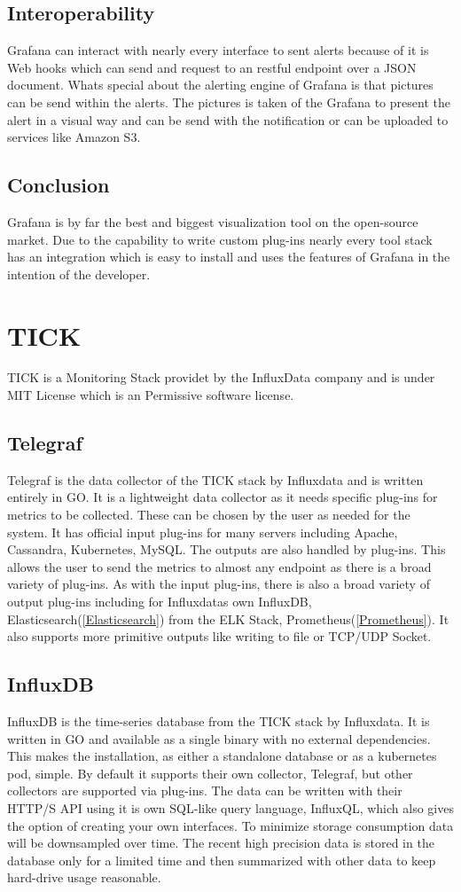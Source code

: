 \subsection{Interoperability}
Grafana can interact with nearly every interface to sent alerts because of it is Web hooks which can send and request to an restful endpoint over a JSON document. Whats special about the alerting engine of Grafana is that pictures can be send within the alerts. The pictures is taken of the Grafana to present the alert in a visual way and can be send with the notification or can be uploaded to services like Amazon S3.

\subsection{Conclusion}
Grafana is by far the best and biggest visualization tool on the open-source market. Due to the capability to write custom plug-ins nearly every tool stack has an integration which is easy to install and uses the features of Grafana in the intention of the developer.

\section{TICK}
\label{tick}
TICK is a Monitoring Stack providet by the InfluxData company and is under MIT License which is an Permissive software license.
\subsection{Telegraf}
Telegraf is the data collector of the TICK stack by Influxdata and is written entirely in GO. It is a lightweight data collector as it needs specific plug-ins for metrics to be collected. These can be chosen by the user as needed for the system. It has official input plug-ins for many servers including Apache, Cassandra, Kubernetes, MySQL.
The outputs are also handled by plug-ins. This allows the user to send the metrics to almost any endpoint as there is a broad variety of plug-ins. As with the input plug-ins, there is also a broad variety of output plug-ins including for Influxdatas own InfluxDB, Elasticsearch(\ref{Elasticsearch}) from the ELK Stack, Prometheus(\ref{Prometheus}). It also supports more primitive outputs like writing to file or TCP/UDP Socket.
\subsection{InfluxDB}
InfluxDB is the time-series database from the TICK stack by Influxdata. It is written in GO and available as a single binary with no external dependencies. This makes the installation, as either a standalone database or as a kubernetes pod, simple.
By default it supports their own collector, Telegraf, but other collectors are supported via plug-ins. The data can be written with their  HTTP/S API using it is own SQL-like query language, InfluxQL, which also gives the option of creating your own interfaces.
To minimize storage consumption data will be downsampled over time. The recent high precision data is stored in the database only for a limited time and then summarized with other data to keep hard-drive usage reasonable. 
